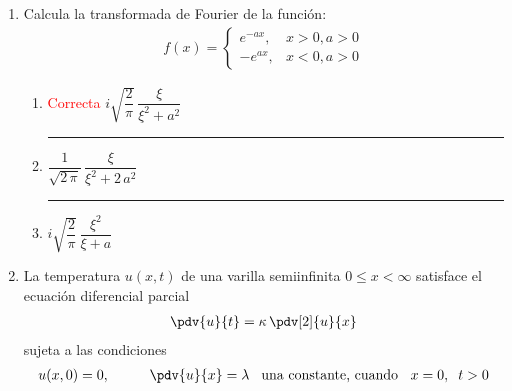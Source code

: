 \begin{enumerate}
\begin{enumerate}[label=1.\alph*)]
\end{enumerate}
\item Calcula la transformada de Fourier de la función:
\begin{align*}
f(x) = \begin{cases}
e^{-a x}, & x > 0, a > 0 \\
-e^{a x}, & x < 0, a > 0
\end{cases}
\end{align*}
\begin{enumerate}[label=2.\alph*)]
\setlength\itemsep{2em}
\item \textcolor{red}{Correcta}  $i \sqrt{\dfrac{2}{\pi}} \, \dfrac{\xi}{\xi^{2} + a^{2}}$ \hrule
\item $\dfrac{1}{\sqrt{2 \, \pi}} \, \dfrac{\xi}{\xi^{2} + 2 \, a^{2}}$\hrule
\item $i \sqrt{\dfrac{2}{\pi}} \, \dfrac{\xi^{2}}{\xi + a}$
\end{enumerate}
\item La temperatura $u (x, t)$ de una varilla semiinfinita
$0 \leq x < \infty$ satisface el ecuación diferencial parcial
\begin{align*}
\pdv{u}{t} = \kappa \, \pdv[2]{u}{x}
\end{align*}
sujeta a las condiciones
\begin{align*}
u(x, 0) = 0, \hspace{1cm} \pdv{u}{x} = \lambda \hspace{0.3cm} \mbox{una constante, cuando } \hspace{0.2cm} x = 0, \hspace{0.2cm} t > 0

\end{align*}
\end{enumerate}
